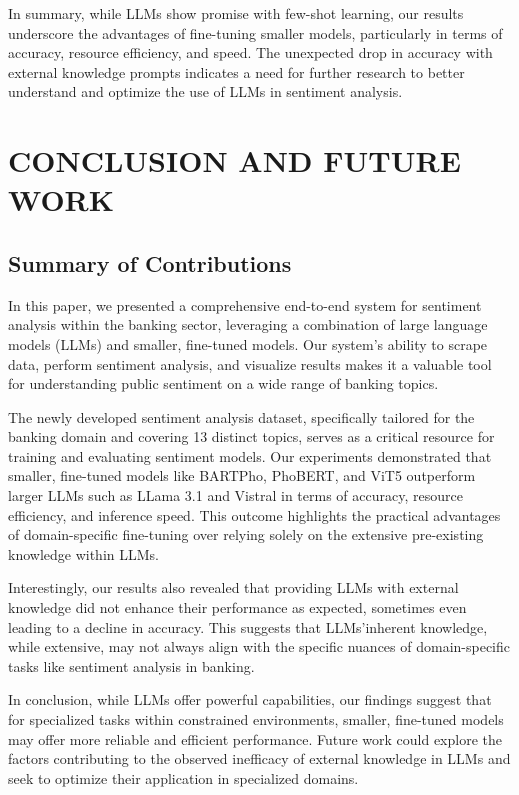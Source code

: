 {In summary, while LLMs show promise with few-shot learning, our results underscore the advantages of fine-tuning smaller models, particularly in terms of accuracy, resource efficiency, and speed. The unexpected drop in accuracy with external knowledge prompts indicates a need for further research to better understand and optimize the use of LLMs in sentiment analysis.

\section{CONCLUSION AND FUTURE WORK}
\subsection{Summary of Contributions}
In this paper, we presented a comprehensive end-to-end system for sentiment analysis within the banking sector, leveraging a combination of large language models (LLMs) and smaller, fine-tuned models. Our system's ability to scrape data, perform sentiment analysis, and visualize results makes it a valuable tool for understanding public sentiment on a wide range of banking topics.

The newly developed sentiment analysis dataset, specifically tailored for the banking domain and covering 13 distinct topics, serves as a critical resource for training and evaluating sentiment models. Our experiments demonstrated that smaller, fine-tuned models like BARTPho, PhoBERT, and ViT5 outperform larger LLMs such as LLama 3.1 and Vistral in terms of accuracy, resource efficiency, and inference speed. This outcome highlights the practical advantages of domain-specific fine-tuning over relying solely on the extensive pre-existing knowledge within LLMs.

Interestingly, our results also revealed that providing LLMs with external knowledge did not enhance their performance as expected, sometimes even leading to a decline in accuracy. This suggests that LLMs'inherent knowledge, while extensive, may not always align with the specific nuances of domain-specific tasks like sentiment analysis in banking.

In conclusion, while LLMs offer powerful capabilities, our findings suggest that for specialized tasks within constrained environments, smaller, fine-tuned models may offer more reliable and efficient performance. Future work could explore the factors contributing to the observed inefficacy of external knowledge in LLMs and seek to optimize their application in specialized domains.

}
